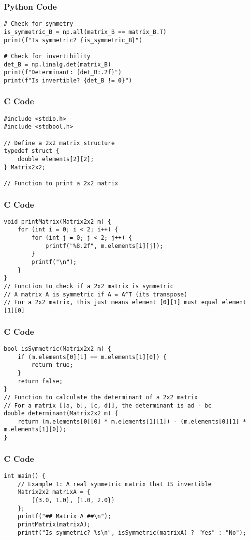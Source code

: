 \documentclass{beamer}
\begin{document}
\begin{frame}[fragile]
\frametitle{Python Code}
\begin{lstlisting}
# Check for symmetry
is_symmetric_B = np.all(matrix_B == matrix_B.T)
print(f"Is symmetric? {is_symmetric_B}")

# Check for invertibility
det_B = np.linalg.det(matrix_B)
print(f"Determinant: {det_B:.2f}")
print(f"Is invertible? {det_B != 0}")
\end{lstlisting}
\end{frame}

\begin{frame}[fragile]
\frametitle{C Code}
\begin{lstlisting}
#include <stdio.h>
#include <stdbool.h>

// Define a 2x2 matrix structure
typedef struct {
    double elements[2][2];
} Matrix2x2;

// Function to print a 2x2 matrix
\end{lstlisting}
\end{frame}

\begin{frame}[fragile]
\frametitle{C Code}
\begin{lstlisting}
void printMatrix(Matrix2x2 m) {
    for (int i = 0; i < 2; i++) {
        for (int j = 0; j < 2; j++) {
            printf("%8.2f", m.elements[i][j]);
        }
        printf("\n");
    }
}
// Function to check if a 2x2 matrix is symmetric
// A matrix A is symmetric if A = A^T (its transpose)
// For a 2x2 matrix, this just means element [0][1] must equal element [1][0]
\end{lstlisting}
\end{frame}

\begin{frame}[fragile]
\frametitle{C Code}
\begin{lstlisting}
bool isSymmetric(Matrix2x2 m) {
    if (m.elements[0][1] == m.elements[1][0]) {
        return true;
    }
    return false;
}
// Function to calculate the determinant of a 2x2 matrix
// For a matrix [[a, b], [c, d]], the determinant is ad - bc
double determinant(Matrix2x2 m) {
    return (m.elements[0][0] * m.elements[1][1]) - (m.elements[0][1] * m.elements[1][0]);
}
\end{lstlisting}
\end{frame}

\begin{frame}[fragile]
\frametitle{C Code}
\begin{lstlisting}
int main() {
    // Example 1: A real symmetric matrix that IS invertible
    Matrix2x2 matrixA = {
        {{3.0, 1.0}, {1.0, 2.0}}
    };
    printf("## Matrix A ##\n");
    printMatrix(matrixA);
    printf("Is symmetric? %s\n", isSymmetric(matrixA) ? "Yes" : "No");
\end{lstlisting}
\end{frame}
\end{document}
